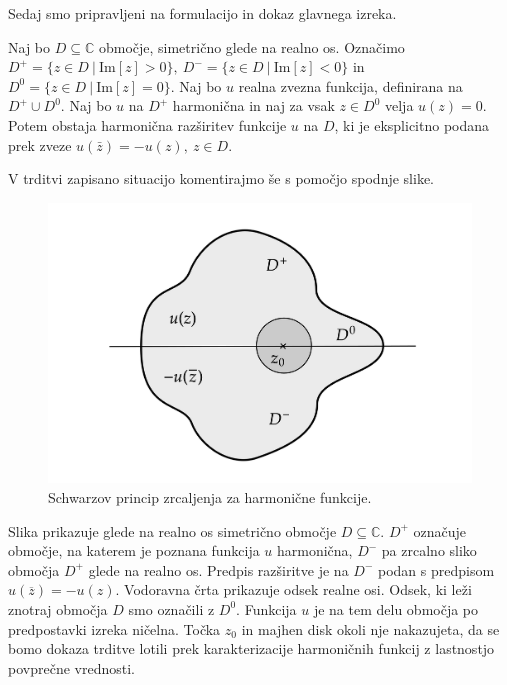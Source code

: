 \documentclass[mat1, tisk]{fmfdelo}
\begin{document}
    Sedaj smo pripravljeni na formulacijo in dokaz glavnega izreka.
    
    \begin{izrek}
        \label{schwarz_harm}
        Naj bo $D \subseteq \mathbb{C}$ območje, simetrično glede na realno os. 
        Označimo $D^{+} = \{z \in D~|~\text{Im}[z] > 0\},~D^{-} = \{z \in D~|~\text{Im}[z] < 0\}$ in $D^{0} = \{z \in D~|~\text{Im}[z] = 0\}$.
        Naj bo $u$ realna zvezna funkcija, definirana na $D^{+} \cup D^0$. Naj bo $u$ na $D^{+}$ harmonična in naj za vsak $z \in D^0$ velja $u(z) = 0$.
        Potem obstaja harmonična razširitev funkcije $u$ na $D$, ki je eksplicitno podana prek zveze $u(\bar{z}) = - u(z),~z \in D$.
    \end{izrek}

    V trditvi zapisano situacijo komentirajmo še s pomočjo spodnje slike. 
    \begin{figure}[H]
        \begin{center}
            \includegraphics[width = \textwidth]{schwarz_harm.png}
            \caption{Schwarzov princip zrcaljenja za harmonične funkcije.}
        \end{center}    
    \end{figure}

    Slika prikazuje glede na realno os simetrično območje $D \subseteq \mathbb{C}$. $D^{+}$ označuje območje, na katerem je poznana funkcija $u$ harmonična, $D^{-}$ pa zrcalno sliko območja $D^+$ glede na realno os. 
    Predpis razširitve je na $D^-$ podan s predpisom \mbox{$u(\overline{z}) = - u(z)$}.
    Vodoravna črta prikazuje odsek realne osi. Odsek, ki leži znotraj območja $D$ smo označili z $D^0$. Funkcija $u$ je na tem delu območja po predpostavki izreka ničelna.
    Točka $z_0$ in majhen disk okoli nje nakazujeta, da se bomo dokaza trditve lotili prek karakterizacije harmoničnih funkcij z lastnostjo povprečne vrednosti.
\end{document}
